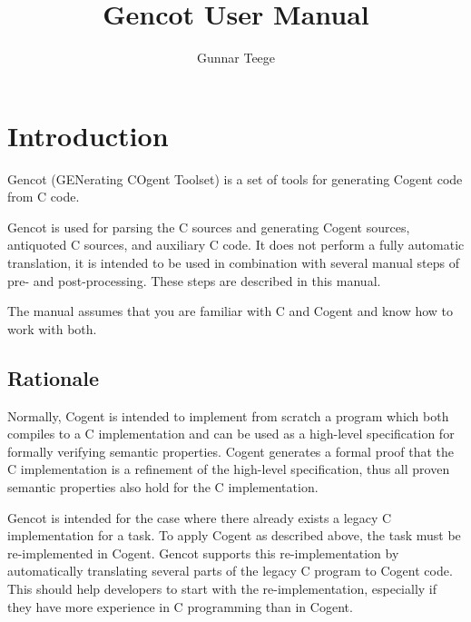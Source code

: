 \documentclass[a4paper]{report}
\begin{document}
\title{Gencot User Manual}
\author{Gunnar Teege}

\maketitle

\chapter{Introduction}

Gencot (GENerating COgent Toolset) is a set of tools for generating Cogent code from C code. 

Gencot is used for parsing the C sources and generating Cogent sources, 
antiquoted C sources, and auxiliary C code. It does not perform a fully automatic translation, it is
intended to be used in combination with several manual steps of pre- and post-processing. These
steps are described in this manual.

The manual assumes that you are familiar with C and Cogent and know how to work with both.

\section{Rationale}
\label{intro-rationale}

Normally, Cogent is intended to implement from scratch a program which both compiles to a C implementation
and can be used as a high-level specification for formally verifying semantic properties.
Cogent generates a formal proof that the C implementation is a refinement of the high-level specification,
thus all proven semantic properties also hold for the C implementation.

Gencot is intended for the case where there already exists a legacy C implementation for a task. To apply
Cogent as described above, the task must be re-implemented in Cogent. Gencot supports this re-implementation 
by automatically translating several parts of the legacy C program to Cogent code. This should help developers 
to start with the re-implementation, especially if they have more experience in C programming than in Cogent.
\end{document}

